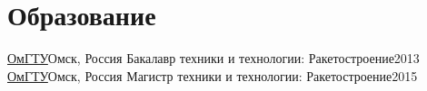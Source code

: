 \section{Образование}
  \resumeSubHeadingListStart

    \resumeSubheading
      {\href{https://omgtu.ru/}{ОмГТУ}}{Омск, Россия}
      {Бакалавр техники и технологии: Ракетостроение}{2013}
    \resumeSubheading
      {\href{https://omgtu.ru/}{ОмГТУ}}{Омск, Россия}
      {Магистр техники и технологии: Ракетостроение}{2015}
      
  \resumeSubHeadingListEnd